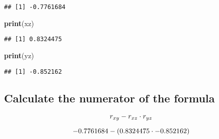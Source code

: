 \documentclass[
]{book}
\newenvironment{Shaded}{\begin{snugshade}}{\end{snugshade}}
\newcommand{\DocumentationTok}[1]{\textcolor[rgb]{0.56,0.35,0.01}{\textbf{\textit{#1}}}}
\newcommand{\FunctionTok}[1]{\textcolor[rgb]{0.13,0.29,0.53}{\textbf{#1}}}
\newcommand{\NormalTok}[1]{#1}
\newcommand{\OtherTok}[1]{\textcolor[rgb]{0.56,0.35,0.01}{#1}}
\newcommand{\SpecialCharTok}[1]{\textcolor[rgb]{0.81,0.36,0.00}{\textbf{#1}}}
\theoremstyle{definition}
\theoremstyle{definition}
\theoremstyle{definition}
\theoremstyle{definition}
\theoremstyle{remark}
\begin{document}
\begin{Shaded}
\end{Shaded}

\begin{verbatim}
## [1] -0.7761684
\end{verbatim}

\begin{Shaded}
\begin{Highlighting}[]
\FunctionTok{print}\NormalTok{(xz)}
\end{Highlighting}
\end{Shaded}

\begin{verbatim}
## [1] 0.8324475
\end{verbatim}

\begin{Shaded}
\begin{Highlighting}[]
\FunctionTok{print}\NormalTok{(yz)}
\end{Highlighting}
\end{Shaded}

\begin{verbatim}
## [1] -0.852162
\end{verbatim}

\hypertarget{calculate-the-numerator-of-the-formula}{%
\subsection{Calculate the numerator of the formula}\label{calculate-the-numerator-of-the-formula}}

\[\large
r_{xy} - r_{xz}  \cdot r_{yz}
\]

\[\large
-0.7761684 - (0.8324475  \cdot -0.852162)
\]
\end{document}
